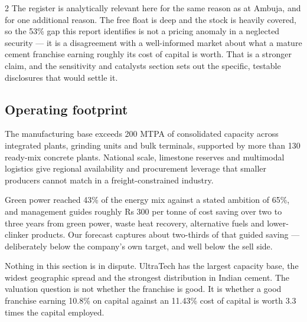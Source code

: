 \begin{paracol}{2}
The register is analytically relevant here for the same reason as at Ambuja, and for
one additional reason. The free float is deep and the stock is heavily covered, so the
53\% gap this report identifies is not a pricing anomaly in a neglected security — it
is a disagreement with a well-informed market about what a mature cement franchise
earning roughly its cost of capital is worth. That is a stronger claim, and the
sensitivity and catalysts section sets out the specific, testable disclosures that
would settle it.

\subsection{Operating footprint}

The manufacturing base exceeds 200 MTPA of consolidated capacity across integrated
plants, grinding units and bulk terminals, supported by more than 130 ready-mix
concrete plants. National scale, limestone reserves and multimodal logistics give
regional availability and procurement leverage that smaller producers cannot match in
a freight-constrained industry.

Green power reached 43\% of the energy mix against a stated ambition of 65\%, and
management guides roughly Rs 300 per tonne of cost saving over two to three years from
green power, waste heat recovery, alternative fuels and lower-clinker products. Our
forecast captures about two-thirds of that guided saving — deliberately below the
company's own target, and well below the sell side.

\begin{keybox}
Nothing in this section is in dispute. UltraTech has the largest capacity base, the
widest geographic spread and the strongest distribution in Indian cement. The
valuation question is not whether the franchise is good. It is whether a good
franchise earning 10.8\% on capital against an 11.43\% cost of capital is worth 3.3
times the capital employed.
\end{keybox}

\switchcolumn
{}



\end{paracol}
